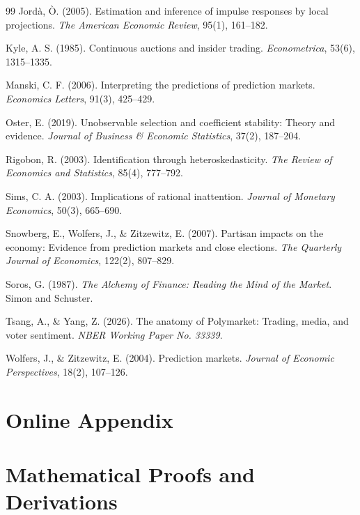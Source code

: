 \documentclass[12pt, a4paper]{article}
\begin{document}
\begin{thebibliography}{99}
Jord\`a, \`O. (2005). Estimation and inference of impulse responses by local projections. \textit{The American Economic Review}, 95(1), 161--182.

Kyle, A. S. (1985). Continuous auctions and insider trading. \textit{Econometrica}, 53(6), 1315--1335.

Manski, C. F. (2006). Interpreting the predictions of prediction markets. \textit{Economics Letters}, 91(3), 425--429.

Oster, E. (2019). Unobservable selection and coefficient stability: Theory and evidence. \textit{Journal of Business \& Economic Statistics}, 37(2), 187--204.

Rigobon, R. (2003). Identification through heteroskedasticity. \textit{The Review of Economics and Statistics}, 85(4), 777--792.

Sims, C. A. (2003). Implications of rational inattention. \textit{Journal of Monetary Economics}, 50(3), 665--690.

Snowberg, E., Wolfers, J., \& Zitzewitz, E. (2007). Partisan impacts on the economy: Evidence from prediction markets and close elections. \textit{The Quarterly Journal of Economics}, 122(2), 807--829.

Soros, G. (1987). \textit{The Alchemy of Finance: Reading the Mind of the Market}. Simon and Schuster.

Tsang, A., \& Yang, Z. (2026). The anatomy of Polymarket: Trading, media, and voter sentiment. \textit{NBER Working Paper No. 33339}.

Wolfers, J., \& Zitzewitz, E. (2004). Prediction markets. \textit{Journal of Economic Perspectives}, 18(2), 107--126.

\end{thebibliography}

\newpage
\appendix
\section*{Online Appendix}

\section{Mathematical Proofs and Derivations}
\label{app:proofs}
\end{document}
